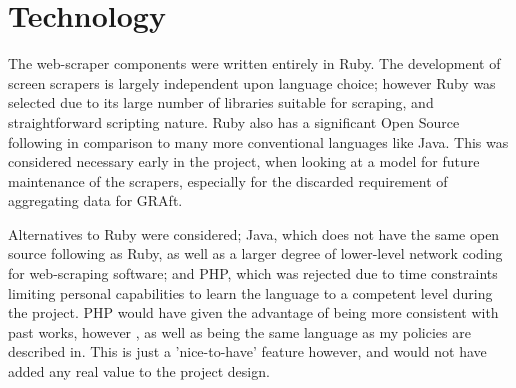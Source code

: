 \section{Technology}

The web-scraper components were written entirely in Ruby. The development of screen scrapers is largely independent upon language choice; however Ruby was selected due to its large number of libraries suitable for scraping, and straightforward scripting nature. Ruby also has a significant Open Source following in comparison to many more conventional languages like Java. This was considered necessary early in the project, when looking at a model for future maintenance of the scrapers, especially for the discarded requirement of aggregating data for GRAft. 

Alternatives to Ruby were considered; Java, which does not have the same open source following as Ruby, as well as a larger degree of lower-level network coding for web-scraping software; and PHP, which was rejected due to time constraints limiting personal capabilities to learn the language to a competent level during the project. PHP would have given the advantage of being more consistent with past works, however \cite{graft_paper}, as well as being the same language as my policies are described in. This is just a 'nice-to-have' feature however, and would not have added any real value to the project design.




%





